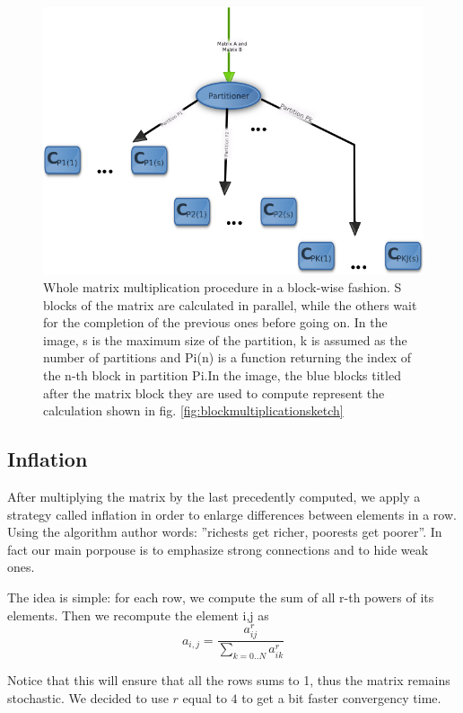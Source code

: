 \begin{figure}
\centering
\includegraphics[scale=0.7]{matrixmultiplication.png}
\caption{Whole matrix multiplication procedure in a block-wise fashion. S blocks of the matrix are calculated
in parallel, while the others wait for the completion of the previous ones before going on.
In the image, s is the maximum size of the partition, k is assumed as the number of partitions and Pi(n) is a function
returning the index of the n-th block in partition Pi.In the image, the blue blocks titled after the matrix block they are used to compute represent the calculation shown in fig. \ref{fig:blockmultiplicationsketch}}
\label{fig:matrixmultiplicationsketch}
\end{figure}

\subsection{Inflation}

After multiplying the matrix by the last precedently computed, we apply a strategy
called inflation in order to enlarge differences between elements in a row.
Using the algorithm author words: ''richests get richer, poorests get poorer''.
In fact our main porpouse is to emphasize strong connections and to hide
weak ones.

The idea is simple: for each row, we compute the sum 
of all r-th powers of its elements.
Then we recompute the element i,j as
$$ a_{i,j} = \frac{a_{ij}^r} {\sum_{k=0..N} a_{ik}^r}$$

Notice that this will ensure that all the rows sums to 1, thus the matrix
remains stochastic. We decided to use $r$ equal to $4$ to get a bit faster
convergency time.

